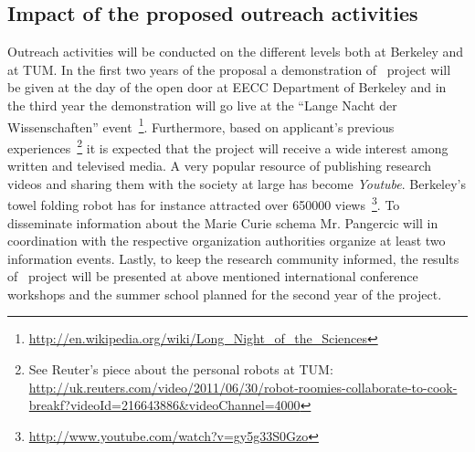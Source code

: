 \subsection{Impact of the proposed outreach activities}
Outreach activities will be conducted on the different levels both at Berkeley
and at TUM. In the first two years of the proposal a demonstration of \ksem\
project will be given at the day of the open door at EECC Department of Berkeley and
in the third year the demonstration will go live at the ``Lange Nacht der Wissenschaften''
event~\footnote{\url{http://en.wikipedia.org/wiki/Long_Night_of_the_Sciences}}.
Furthermore, based on applicant's previous experiences~\footnote{See Reuter's piece about
the personal robots at TUM: 
\url{http://uk.reuters.com/video/2011/06/30/robot-roomies-collaborate-to-cook-breakf?videoId=216643886&videoChannel=4000}} 
it is expected that the project will receive a wide interest among written and televised media.
A very popular resource of publishing research videos and sharing them with the society at large
has become \emph{Youtube}. Berkeley's towel folding robot has for instance attracted over 650000 
views~\footnote{\url{http://www.youtube.com/watch?v=gy5g33S0Gzo}}. To disseminate information about
the Marie Curie schema Mr. Pangercic will in coordination with the respective organization authorities
organize at least two information events. Lastly, to keep the research community informed, the results of 
\ksem\ project will be presented at above mentioned international conference workshops and the summer school planned for
the second year of the project.
 
\newpage